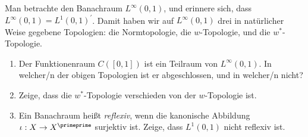 \begin{exercise}

Man betrachte den Banachraum $L^\infty(0,1)$, und erinnere sich, dass $L^\infty(0,1) = L^1(0,1)^\prime$.
Damit haben wir auf $L^\infty(0,1)$ drei in natürlicher Weise gegebene Topologien:
die Normtopologie, die $w$-Topologie, und die $w^\ast$-Topologie.

\begin{enumerate}[label = \alph*)]

  \item
  Der Funktionenraum $C([0,1])$ ist ein Teilraum von $L^\infty(0,1)$.
  In welcher/n der obigen Topologien ist er abgeschlossen, und in welcher/n nicht?

  \item
  Zeige, dass die $w^\ast$-Topologie verschieden von der $w$-Topologie ist.

  \item
  Ein Banachraum heißt \textit{reflexiv}, wenn die kanonische Abbildung $\iota: X \rightarrow X^{\primeprime}$ surjektiv ist.
  Zeige, dass $L^1(0,1)$ nicht reflexiv ist.

\end{enumerate}

\end{exercise}

